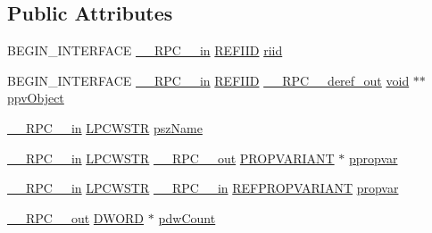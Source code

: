 \subsection*{Public Attributes}
\begin{DoxyCompactItemize}
\item 
B\+E\+G\+I\+N\+\_\+\+I\+N\+T\+E\+R\+F\+A\+CE \hyperlink{rpcsal_8h_a20b7f6da600a05c8b541659f14f7f0e6}{\+\_\+\+\_\+\+R\+P\+C\+\_\+\+\_\+in} \hyperlink{px__win__ds_8c_a80ec49c8ae61e234197d5071d2df497d}{R\+E\+F\+I\+ID} \hyperlink{struct_i_named_property_store_vtbl_a2001956246d68e31b920e1d56a261675}{riid}
\item 
B\+E\+G\+I\+N\+\_\+\+I\+N\+T\+E\+R\+F\+A\+CE \hyperlink{rpcsal_8h_a20b7f6da600a05c8b541659f14f7f0e6}{\+\_\+\+\_\+\+R\+P\+C\+\_\+\+\_\+in} \hyperlink{px__win__ds_8c_a80ec49c8ae61e234197d5071d2df497d}{R\+E\+F\+I\+ID} \hyperlink{rpcsal_8h_a23bc188526f10656f9c79d950f6c3192}{\+\_\+\+\_\+\+R\+P\+C\+\_\+\+\_\+deref\+\_\+out} \hyperlink{sound_8c_ae35f5844602719cf66324f4de2a658b3}{void} $\ast$$\ast$ \hyperlink{struct_i_named_property_store_vtbl_a1283b9a2967a9497fca4900e2fd0fdb6}{ppv\+Object}
\item 
\hyperlink{rpcsal_8h_a20b7f6da600a05c8b541659f14f7f0e6}{\+\_\+\+\_\+\+R\+P\+C\+\_\+\+\_\+in} \hyperlink{mapinls_8h_a25fda90f83ded0efd5456a4e7eda1e0c}{L\+P\+C\+W\+S\+TR} \hyperlink{struct_i_named_property_store_vtbl_a05c9fff903881ff0f397f7589b957348}{psz\+Name}
\item 
\hyperlink{rpcsal_8h_a20b7f6da600a05c8b541659f14f7f0e6}{\+\_\+\+\_\+\+R\+P\+C\+\_\+\+\_\+in} \hyperlink{mapinls_8h_a25fda90f83ded0efd5456a4e7eda1e0c}{L\+P\+C\+W\+S\+TR} \hyperlink{rpcsal_8h_aa518a2c78d44d75f3685c32c455c5ed8}{\+\_\+\+\_\+\+R\+P\+C\+\_\+\+\_\+out} \hyperlink{propidl_8h_ae902c1757cd16052896846fa4ebb88d8}{P\+R\+O\+P\+V\+A\+R\+I\+A\+NT} $\ast$ \hyperlink{struct_i_named_property_store_vtbl_a21ce487a54968dbe2d1e42e914e64864}{ppropvar}
\item 
\hyperlink{rpcsal_8h_a20b7f6da600a05c8b541659f14f7f0e6}{\+\_\+\+\_\+\+R\+P\+C\+\_\+\+\_\+in} \hyperlink{mapinls_8h_a25fda90f83ded0efd5456a4e7eda1e0c}{L\+P\+C\+W\+S\+TR} \hyperlink{rpcsal_8h_a20b7f6da600a05c8b541659f14f7f0e6}{\+\_\+\+\_\+\+R\+P\+C\+\_\+\+\_\+in} \hyperlink{propidl_8h_ac8a8bd0f5f7f9b7e9f8e6fd4fd039fda}{R\+E\+F\+P\+R\+O\+P\+V\+A\+R\+I\+A\+NT} \hyperlink{struct_i_named_property_store_vtbl_aa6a84e0137e3c7ae18419b03686c681f}{propvar}
\item 
\hyperlink{rpcsal_8h_aa518a2c78d44d75f3685c32c455c5ed8}{\+\_\+\+\_\+\+R\+P\+C\+\_\+\+\_\+out} \hyperlink{mapinls_8h_ad342ac907eb044443153a22f964bf0af}{D\+W\+O\+RD} $\ast$ \hyperlink{struct_i_named_property_store_vtbl_a0c06c7a1c281c20ce41bb5aeb228c519}{pdw\+Count}
$$
\end{DoxyCompactItemize}
